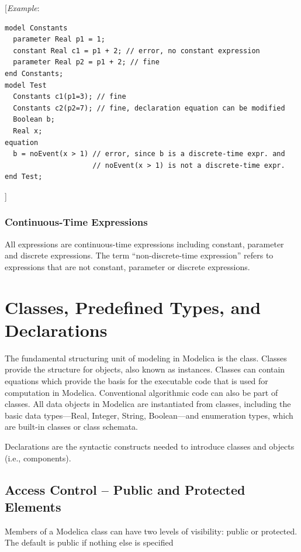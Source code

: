 \documentclass[10pt,a4paper]{report}
\def\doublelabel#1{\label{#1}\hypertarget{#1}{}}
\begin{document}
{[}\emph{Example}:
\begin{lstlisting}[language=modelica]
model Constants
  parameter Real p1 = 1;
  constant Real c1 = p1 + 2; // error, no constant expression
  parameter Real p2 = p1 + 2; // fine
end Constants;
model Test
  Constants c1(p1=3); // fine
  Constants c2(p2=7); // fine, declaration equation can be modified
  Boolean b;
  Real x;
equation
  b = noEvent(x > 1) // error, since b is a discrete-time expr. and
                     // noEvent(x > 1) is not a discrete-time expr.
end Test;
\end{lstlisting}

{]}

\subsection{Continuous-Time Expressions}\doublelabel{continuous-time-expressions}

All expressions are continuous-time expressions including constant,
parameter and discrete expressions. The term ``non-discrete-time
expression'' refers to expressions that are not constant, parameter or
discrete expressions.

\chapter{Classes, Predefined Types, and Declarations}\doublelabel{class-predefined-types-and-declarations}

The fundamental structuring unit of modeling in Modelica is the class.
Classes provide the structure for objects, also known as instances.
Classes can contain equations which provide the basis for the executable
code that is used for computation in Modelica. Conventional algorithmic
code can also be part of classes. All data objects in Modelica are
instantiated from classes, including the basic data types---Real,
Integer, String, Boolean---and enumeration types, which are built-in
classes or class schemata.

Declarations are the syntactic constructs needed to introduce classes
and objects (i.e., components).

\section{Access Control -- Public and Protected Elements}\doublelabel{access-control-public-and-protected-elements}

Members of a Modelica class can have two levels of visibility: public or
protected. The default is public if nothing else is specified
\end{document}
